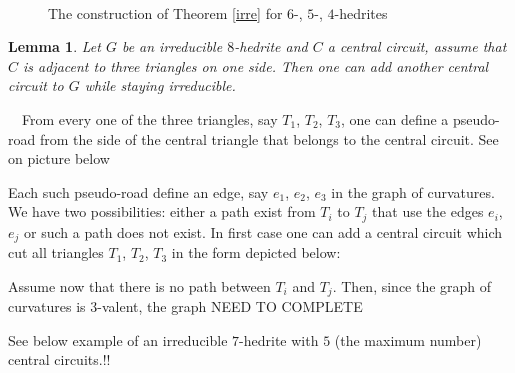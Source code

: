 \documentclass[12pt]{article}
\newtheorem{lemma}{Lemma}
\newcommand{\proof}{\noindent{\bf Proof.}\ \ }
\begin{document}

\begin{figure}
\centering
\mbox{
}
\caption{The construction of Theorem \ref{irre} for $6$-, $5$-, $4$-hedrites}
\label{The456hedriteCases}
\end{figure}




\begin{lemma}
Let $G$ be an irreducible $8$-hedrite and $C$ a central circuit, assume that $C$ is adjacent to three triangles on one side. Then one can add another central circuit to $G$ while staying irreducible.
\end{lemma}
\proof From every one of the three triangles, say $T_1$, $T_2$, $T_3$, one can define a pseudo-road from the side of the central triangle that belongs to the central circuit. See on picture below
\begin{center}
\epsfxsize=40mm
\end{center}
Each such pseudo-road define an edge, say $e_1$, $e_2$, $e_3$ in the graph 
of curvatures. We have two possibilities: either a path exist from $T_i$ 
to $T_j$ that use the edges $e_i$, $e_j$ or such a path does not exist. In 
first case one can add a central circuit which cut all triangles $T_1$, 
$T_2$, $T_3$ in the form depicted below:
\begin{center}
\epsfxsize=40mm
\end{center}

Assume now that there is no path between $T_i$ and $T_j$. Then, since the graph of curvatures is $3$-valent, the graph NEED TO COMPLETE













See below example of an irreducible $7$-hedrite with $5$ (the maximum number) central circuits.!!

\begin{center}
\epsfxsize=60mm
\end{center}
\end{document}
